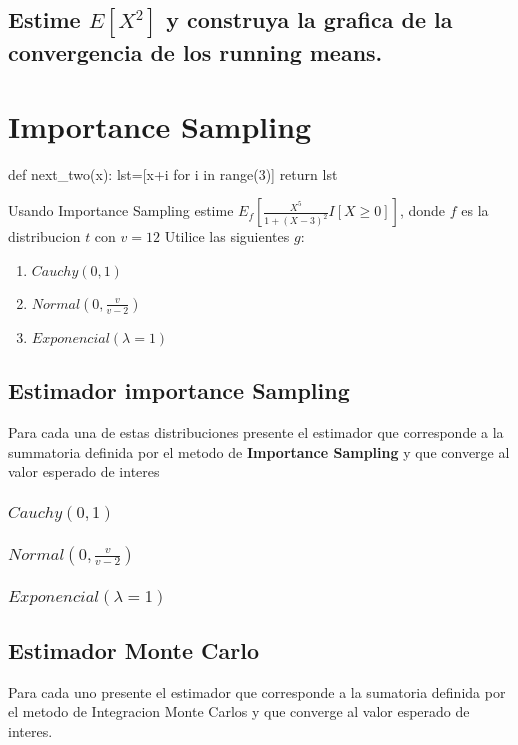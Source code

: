 \documentclass{article}
\begin{document}
\subsection{Estime $E[X^2]$ y construya la grafica de la convergencia de los running means.}

\section{Importance Sampling}
\begin{python}
	def next_two(x):
	lst=[x+i for i in range(3)]
	return lst
\end{python}

Usando Importance Sampling estime $E_f\left[ \frac{X^5}{1+(X - 3)^2}I[X \ge 0] \right]$, donde $f$ es la
distribucion $t$ con $v=12$ Utilice las siguientes $g$:
\begin{enumerate}
	\item $Cauchy(0,1)$
	\item $Normal(0, \frac{v}{v-2})$
	\item $Exponencial(\lambda=1)$
\end{enumerate}

\subsection{Estimador importance Sampling}
Para cada una de estas distribuciones presente el estimador que corresponde a la summatoria definida
por el metodo de \textbf{Importance Sampling} y que converge al valor esperado de interes
\subsubsection{$Cauchy(0,1)$}
\subsubsection{$Normal(0, \frac{v}{v-2})$}
\subsubsection{$Exponencial(\lambda=1)$}

\subsection{Estimador Monte Carlo}
Para cada uno presente el estimador que corresponde a la sumatoria definida por el metodo de Integracion
Monte Carlos y que converge al valor esperado de interes.
\end{document}
